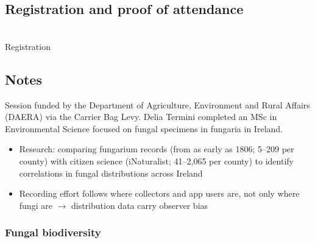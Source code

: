 \subsection{Registration and proof of attendance}
\begin{center}
\\[2pt]
{\footnotesize\color{muted}Registration}
\end{center}


\subsection{Notes}
Session funded by the Department of Agriculture, Environment and Rural Affairs (DAERA) via the Carrier Bag Levy. Delia Termini completed an MSc in Environmental Science focused on fungal specimens in fungaria in Ireland.

\begin{itemize}
  \item Research: comparing fungarium records (from as early as 1806; 5--209 per county) with citizen science (iNaturalist; 41--2,065 per county) to identify correlations in fungal distributions across Ireland
  \item Recording effort follows where collectors and app users are, not only where fungi are $\rightarrow$ distribution data carry observer bias
\end{itemize}

\begin{imagerow}
   \hfill
\end{imagerow}

\subsubsection{Fungal biodiversity}

\begin{imagerow}
   \hfill
   \hfill
  \begin{minipage}[t]{0.22\linewidth}\centering
    \\[6pt]
  \end{minipage} \hfill
\end{imagerow}

